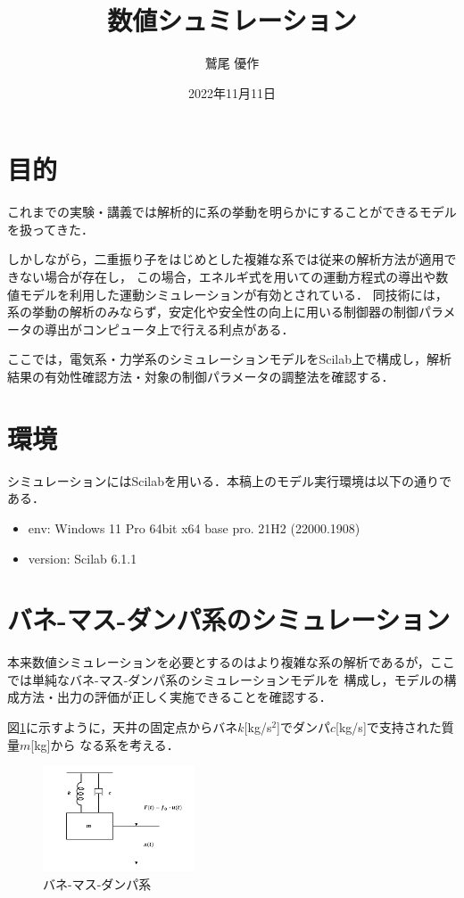 \documentclass[dvipdfmx,titlepage,a4j]{jsarticle}  %
\title{数値シュミレーション}
\author{鷲尾 優作}
\date{2022年11月11日}
\begin{document}
\pagestyle{foot}

\maketitle

\section{目的}
これまでの実験・講義では解析的に系の挙動を明らかにすることができるモデルを扱ってきた．

しかしながら，二重振り子をはじめとした複雑な系では従来の解析方法が適用できない場合が存在し，
この場合，エネルギ式を用いての運動方程式の導出や数値モデルを利用した運動シミュレーションが有効とされている．
同技術には，系の挙動の解析のみならず，安定化や安全性の向上に用いる制御器の制御パラメータの導出がコンピュータ上で行える利点がある．

ここでは，電気系・力学系のシミュレーションモデルをScilab上で構成し，解析結果の有効性確認方法・対象の制御パラメータの調整法を確認する．

\section{環境}
シミュレーションにはScilabを用いる．本稿上のモデル実行環境は以下の通りである．

\begin{itemize}
  \item env: Windows 11 Pro 64bit x64 base pro. 21H2 (22000.1908)
  \item version: Scilab 6.1.1
\end{itemize}

\section{バネ-マス-ダンパ系のシミュレーション}
本来数値シミュレーションを必要とするのはより複雑な系の解析であるが，ここでは単純なバネ-マス-ダンパ系のシミュレーションモデルを
構成し，モデルの構成方法・出力の評価が正しく実施できることを確認する．

図\ref{fig:spring-mass-damper}に示すように，天井の固定点からバネ$k$[kg/s$^2$]でダンパ$c$[kg/s]で支持された質量$m$[kg]から
なる系を考える．

\begin{figure}[htbp]
  \centering
  \includegraphics[width=0.4\textwidth]{../graph/bane-po.png}
  \caption{バネ-マス-ダンパ系}
  \label{fig:spring-mass-damper}
\end{figure}
\end{document}
